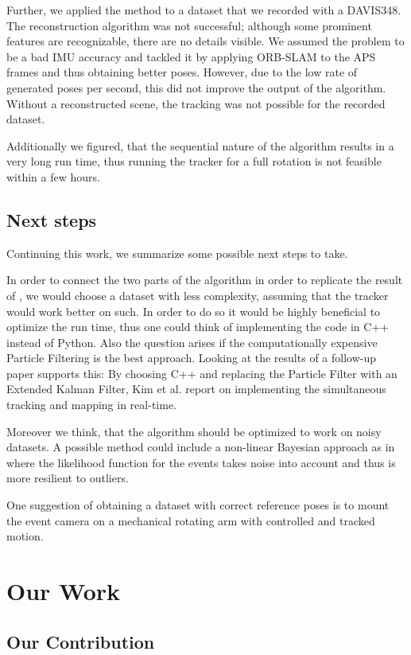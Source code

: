 \documentclass[10pt,twocolumn,letterpaper]{article}
\begin{document}
Further, we applied the method to a dataset that we recorded with a DAVIS348. The reconstruction algorithm was not successful; although some prominent features are recognizable, there are no details visible. We assumed the problem to be a bad IMU accuracy and tackled it by applying ORB-SLAM to the APS frames and thus obtaining better poses. However, due to the low rate of generated poses per second, this did not improve the output of the algorithm. Without a reconstructed scene, the tracking was not possible for the recorded dataset. 

Additionally we figured, that the sequential nature of the algorithm results in a very long run time, thus running the tracker for a full rotation is not feasible within a few hours. 

\subsection{Next steps}
Continuing this work, we summarize some possible next steps to take. 

In order to connect the two parts of the algorithm in order to replicate the result of \cite{kim2014simultaneous}, we would choose a dataset with less complexity, assuming that the tracker would work better on such. In order to do so it would be highly beneficial to optimize the run time, thus one could think of implementing the code in C++ instead of Python. Also the question arises if the computationally expensive Particle Filtering is the best approach. Looking at the results of a follow-up paper \cite{kim2} supports this: By choosing C++  and replacing the Particle Filter with an Extended Kalman Filter, Kim et al. report on implementing the simultaneous tracking and mapping in real-time.

Moreover we think, that the algorithm should be optimized to work on noisy datasets. A possible method could include a non-linear Bayesian approach as in \cite{paperpresentation} where the likelihood function for the events takes noise into account and thus is more resilient to outliers. 

One suggestion of obtaining a dataset with correct reference poses is to mount the event camera on a mechanical rotating arm with controlled and tracked motion. 

\section{Our Work}

\subsection{Our Contribution}
\end{document}
